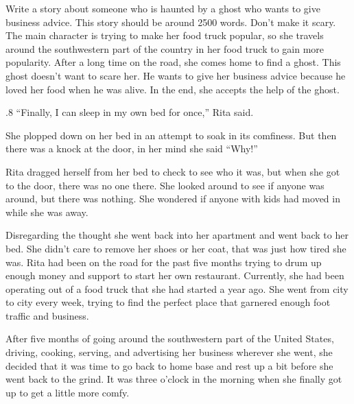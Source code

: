 \documentclass{article}
\begin{document}
\begin{tcolorbox}[colback=white, colframe=my-green, coltitle=black, parskip=5mm, title=
\textbf{Example Prompt}, breakable]
\scriptsize
  Write a story about someone who is haunted by a ghost who wants to give business advice. This story should be around 2500 words. Don’t make it scary. The main character is trying to make her food truck popular, so she travels around the southwestern part of the country in her food truck to gain more popularity. After a long time on the road, she comes home to find a ghost. This ghost doesn’t want to scare her. He wants to give her business advice because he loved her food when he was alive. In the end, she accepts the help of the ghost.
\end{tcolorbox}

\begin{tcolorbox}[colback=white, colframe=my-green, coltitle=black, parskip=5mm, title=
    \textbf{Human-written Story}, breakable]
  \scriptsize
  \begin{spacing}{.8}
“Finally, I can sleep in my own bed for once,” Rita said. \\\par
        She plopped down on her bed in an attempt to soak in its comfiness. But then there was a knock at the door, in her mind she said “Why!” \\\par
        Rita dragged herself from her bed to check to see who it was, but when she got to the door, there was no one there. She looked around to see if anyone was around, but there was nothing. She wondered if anyone with kids had moved in while she was away. \\\par
        Disregarding the thought she went back into her apartment and went back to her bed. She didn’t care to remove her shoes or her coat, that was just how tired she was. Rita had been on the road for the past five months trying to drum up enough money and support to start her own restaurant. Currently, she had been operating out of a food truck that she had started a year ago. She went from city to city every week, trying to find the perfect place that garnered enough foot traffic and business. \\\par
        After five months of going around the southwestern part of the United States, driving, cooking, serving, and advertising her business wherever she went, she decided that it was time to go back to home base and rest up a bit before she went back to the grind. It was three o’clock in the morning when she finally got up to get a little more comfy. \\\par

\end{spacing}
\end{tcolorbox}
\end{document}
